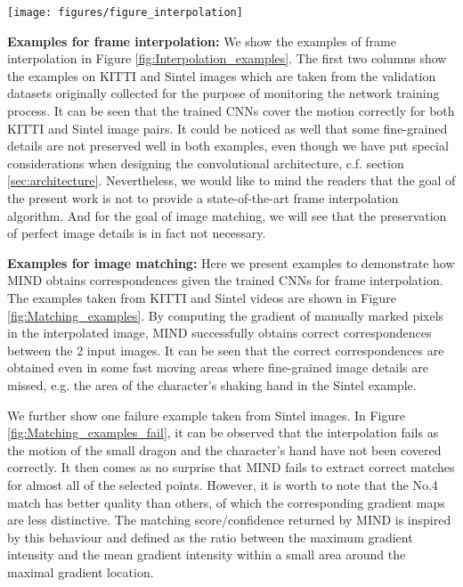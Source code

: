 \documentclass[runningheads]{llncs}
\begin{document}
	\begin{figure*}[t]
		\centering
		\texttt{[image: figures/figure\_interpolation]}
		\caption{Examples of Frame interpolation (best viewed in colour). From left to right: example on KITTI, Sintel, ETH Multi-Person Tracking dataset\cite{ess2009robust} and Bonn Benchmark on Tracking \cite{KleinIROS10}, respectively. In each column, the first image is an overlay of the two input frames. The second one is the interpolated image obtained by our network. For the first example, we use the network trained on KITTI itself. For all others, we use the network fine-tuned on Sintel data.}
		\label{fig:Interpolation_examples}
	\end{figure*}	
	
	\vspace{+0.1cm}
	\noindent\textbf{Examples for frame interpolation:} We show the examples of frame interpolation in Figure \ref{fig:Interpolation_examples}. The first two columns show the examples on KITTI and Sintel images which are taken from the validation datasets originally collected for the purpose of monitoring the network training process. It can be seen that the trained CNNs cover the motion correctly for both KITTI and Sintel image pairs. It could be noticed as well that some fine-grained details are not preserved well in both examples, even though we have put special considerations when designing the convolutional architecture, c.f. section \ref{sec:architecture}. Nevertheless, we would like to mind the readers that the goal of the present work is not to provide a state-of-the-art frame interpolation algorithm. And for the goal of image matching, we will see that the preservation of perfect image details is in fact not necessary. 

	\vspace{+0.1cm}
	\noindent\textbf{Examples for image matching:} Here we present examples to demonstrate how MIND obtains correspondences given the trained CNNs for frame interpolation. The examples taken from KITTI and Sintel videos are shown in Figure \ref{fig:Matching_examples}. By computing the gradient of manually marked pixels in the interpolated image, MIND successfully obtains correct correspondences between the 2 input images. It can be seen that the correct correspondences are obtained even in some fast moving areas where fine-grained image details are missed, e.g. the area of the character's shaking hand in the Sintel example.
	
	We further show one failure example taken from Sintel images. In Figure \ref{fig:Matching_examples_fail}, it can be observed that the interpolation fails as the motion of the small dragon and the character's hand have not been covered correctly. It then comes as no surprise that MIND fails to extract correct matches for almost all of the selected points. However, it is worth to note that the No.4 match has better quality than others, of which the corresponding gradient maps are less distinctive. The matching score/confidence returned by MIND is inspired by this behaviour and defined as the ratio between the maximum gradient intensity and the mean gradient intensity within a small area around the maximal gradient location.
\end{document}
